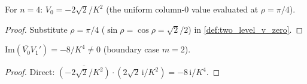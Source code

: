 \begin{lemma}[boundary evaluation of $V_0$ at $n = 4$]
  \label{lem:two_level_v_zero_of_four}
  For $n = 4$: $V_0 = -2\sqrt2/K^2$ (the uniform column-0 value evaluated at
  $\rho = \pi/4$).
\end{lemma}
\begin{proof}
  Substitute $\rho = \pi/4$ ($\sin\rho = \cos\rho = \sqrt2/2$) in
  \cref{def:two_level_v_zero}.
\end{proof}

\begin{lemma}
  \label{lem:im_conj_two_level_v_prime}
  $\mathrm{Im}(\overline{V_0}V_1') = -8/K^4 \ne 0$ (boundary case $m = 2$).
\end{lemma}
\begin{proof}
  Direct: $\overline{(-2\sqrt2/K^2)}\cdot(2\sqrt2\,\mathrm{i}/K^2)
  = -8\,\mathrm{i}/K^4$.
\end{proof}

